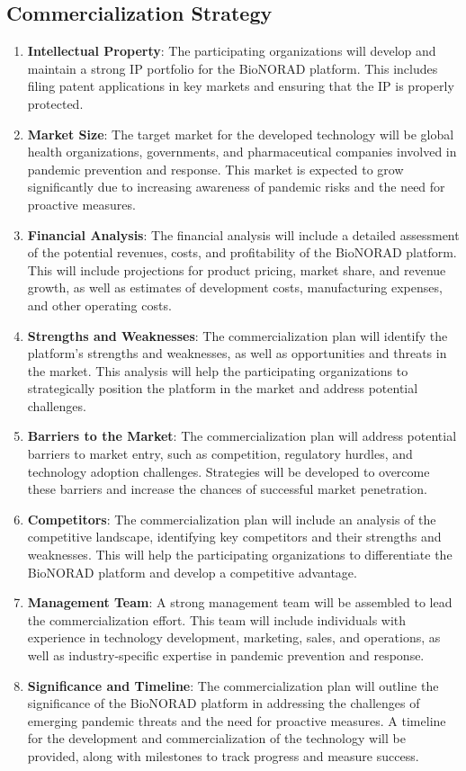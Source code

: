 \documentclass[onecolumn, compsoc,12pt]{IEEEtran}
\begin{document}
\subsection{Commercialization Strategy}

\begin{enumerate}
    \item \textbf{Intellectual Property}: The participating organizations will develop and maintain a strong IP portfolio for the BioNORAD platform. This includes filing patent applications in key markets and ensuring that the IP is properly protected.
    \item \textbf{Market Size}: The target market for the developed technology will be global health organizations, governments, and pharmaceutical companies involved in pandemic prevention and response. This market is expected to grow significantly due to increasing awareness of pandemic risks and the need for proactive measures.
    \item \textbf{Financial Analysis}: The financial analysis will include a detailed assessment of the potential revenues, costs, and profitability of the BioNORAD platform. This will include projections for product pricing, market share, and revenue growth, as well as estimates of development costs, manufacturing expenses, and other operating costs.
    \item \textbf{Strengths and Weaknesses}: The commercialization plan will identify the platform's strengths and weaknesses, as well as opportunities and threats in the market. This analysis will help the participating organizations to strategically position the platform in the market and address potential challenges.
    \item \textbf{Barriers to the Market}: The commercialization plan will address potential barriers to market entry, such as competition, regulatory hurdles, and technology adoption challenges. Strategies will be developed to overcome these barriers and increase the chances of successful market penetration.
    \item \textbf{Competitors}: The commercialization plan will include an analysis of the competitive landscape, identifying key competitors and their strengths and weaknesses. This will help the participating organizations to differentiate the BioNORAD platform and develop a competitive advantage.
    \item \textbf{Management Team}: A strong management team will be assembled to lead the commercialization effort. This team will include individuals with experience in technology development, marketing, sales, and operations, as well as industry-specific expertise in pandemic prevention and response.
    \item \textbf{Significance and Timeline}: The commercialization plan will outline the significance of the BioNORAD platform in addressing the challenges of emerging pandemic threats and the need for proactive measures. A timeline for the development and commercialization of the technology will be provided, along with milestones to track progress and measure success.
\end{enumerate}
\end{document}
